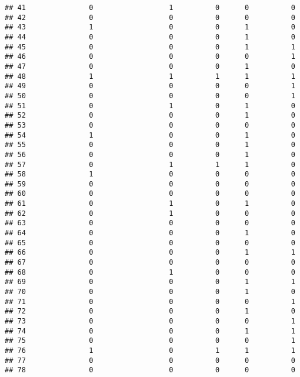 \documentclass[
]{article}
\begin{document}
\begin{verbatim}
## 41               0                  1          0      0          0
## 42               0                  0          0      0          0
## 43               1                  0          0      1          0
## 44               0                  0          0      1          0
## 45               0                  0          0      1          1
## 46               0                  0          0      0          1
## 47               0                  0          0      1          0
## 48               1                  1          1      1          1
## 49               0                  0          0      0          1
## 50               0                  0          0      0          1
## 51               0                  1          0      1          0
## 52               0                  0          0      1          0
## 53               0                  0          0      0          0
## 54               1                  0          0      1          0
## 55               0                  0          0      1          0
## 56               0                  0          0      1          0
## 57               0                  1          1      1          0
## 58               1                  0          0      0          0
## 59               0                  0          0      0          0
## 60               0                  0          0      0          0
## 61               0                  1          0      1          0
## 62               0                  1          0      0          0
## 63               0                  0          0      0          0
## 64               0                  0          0      1          0
## 65               0                  0          0      0          0
## 66               0                  0          0      1          1
## 67               0                  0          0      0          0
## 68               0                  1          0      0          0
## 69               0                  0          0      1          1
## 70               0                  0          0      1          0
## 71               0                  0          0      0          1
## 72               0                  0          0      1          0
## 73               0                  0          0      0          1
## 74               0                  0          0      1          1
## 75               0                  0          0      0          1
## 76               1                  0          1      1          1
## 77               0                  0          0      0          0
## 78               0                  0          0      0          0

\end{verbatim}
\end{document}
